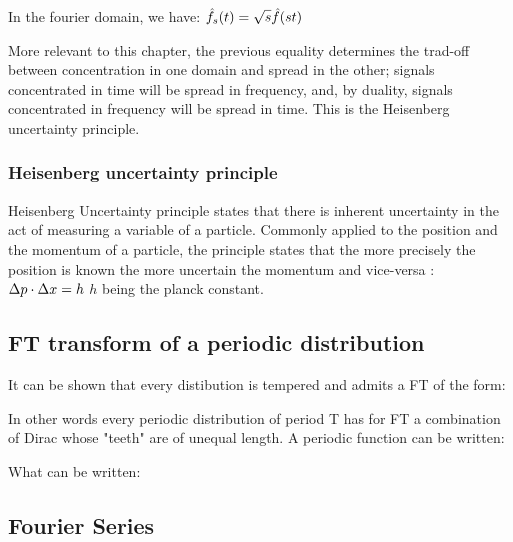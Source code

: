 \documentclass[11pt, openright]{book}
\begin{document}
In the fourier domain, we have: $\displaystyle{\hat{f_s}(t)=\sqrt{s}\hat{f}(st) }$

More relevant to this chapter, the previous equality determines the trad-off between concentration in one domain and spread in the other; signals concentrated in time will be spread in frequency, and, by duality, signals concentrated in frequency will be spread in time. This is the Heisenberg uncertainty principle.

\subsubsection{Heisenberg uncertainty principle}

Heisenberg Uncertainty principle states that there is inherent uncertainty in the act of measuring a variable of a particle. Commonly applied to the position and the momentum of a particle, the principle states that the more precisely the position is known the more uncertain the momentum and vice-versa : $\displaystyle{\Delta p \cdot \Delta x = h}$ $h$ being the planck constant.



 \subsection{FT transform of a periodic distribution}

 It can be shown that every distibution is tempered and admits a FT of the form: 

 In other words every periodic distribution of period T has for FT a combination of Dirac whose "teeth" are of unequal length. A periodic function can be written: 

 What can be written: 

  \subsection{Fourier Series}
\end{document}
